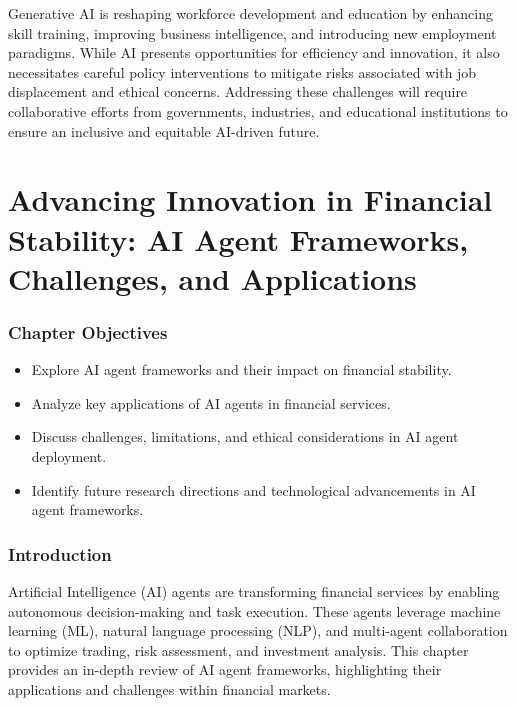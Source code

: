 \documentclass[a4paper,headinclude=on,footinclude=on,12pt,oneside]{scrbook}
\begin{document}

Generative AI is reshaping workforce development and education by enhancing skill training, improving business intelligence, and introducing new employment paradigms. While AI presents opportunities for efficiency and innovation, it also necessitates careful policy interventions to mitigate risks associated with job displacement and ethical concerns. Addressing these challenges will require collaborative efforts from governments, industries, and educational institutions to ensure an inclusive and equitable AI-driven future.

\chapter{Advancing Innovation in Financial Stability: AI Agent Frameworks, Challenges, and Applications}

\subsection*{Chapter Objectives}
\begin{itemize}
	\item Explore AI agent frameworks and their impact on financial stability.
	\item Analyze key applications of AI agents in financial services.
	\item Discuss challenges, limitations, and ethical considerations in AI agent deployment.
	\item Identify future research directions and technological advancements in AI agent frameworks.
\end{itemize}

\subsection*{Introduction}
Artificial Intelligence (AI) agents are transforming financial services by enabling autonomous decision-making and task execution. These agents leverage machine learning (ML), natural language processing (NLP), and multi-agent collaboration to optimize trading, risk assessment, and investment analysis. This chapter provides an in-depth review of AI agent frameworks, highlighting their applications and challenges within financial markets.
\end{document}
